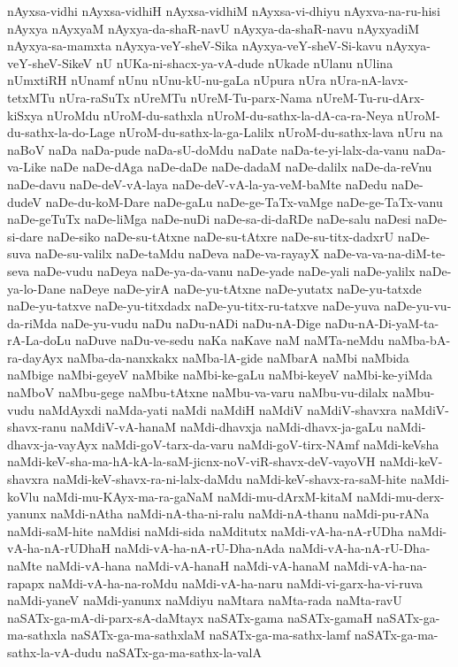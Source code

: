 {nAyxsa-vidhi
nAyxsa-vidhiH
nAyxsa-vidhiM
nAyxsa-vi-dhiyu
nAyxva-na-ru-hisi
nAyxya
nAyxyaM
nAyxya-da-shaR-navU
nAyxya-da-shaR-navu
nAyxyadiM
nAyxya-sa-mamxta
nAyxya-veY-sheV-Sika
nAyxya-veY-sheV-Si-kavu
nAyxya-veY-sheV-SikeV
nU
nUKa-ni-shacx-ya-vA-dude
nUkade
nUlanu
nUlina
nUmxtiRH
nUnamf
nUnu
nUnu-kU-nu-gaLa
nUpura
nUra
nUra-nA-lavx-tetxMTu
nUra-raSuTx
nUreMTu
nUreM-Tu-parx-Nama
nUreM-Tu-ru-dArx-kiSxya
nUroMdu
nUroM-du-sathxla
nUroM-du-sathx-la-dA-ca-ra-Neya
nUroM-du-sathx-la-do-Lage
nUroM-du-sathx-la-ga-Lalilx
nUroM-du-sathx-lava
nUru
na
naBoV
naDa
naDa-pude
naDa-sU-doMdu
naDate
naDa-te-yi-lalx-da-vanu
naDa-va-Like
naDe
naDe-dAga
naDe-daDe
naDe-dadaM
naDe-dalilx
naDe-da-reVnu
naDe-davu
naDe-deV-vA-laya
naDe-deV-vA-la-ya-veM-baMte
naDedu
naDe-dudeV
naDe-du-koM-Dare
naDe-gaLu
naDe-ge-TaTx-vaMge
naDe-ge-TaTx-vanu
naDe-geTuTx
naDe-liMga
naDe-nuDi
naDe-sa-di-daRDe
naDe-salu
naDesi
naDe-si-dare
naDe-siko
naDe-su-tAtxne
naDe-su-tAtxre
naDe-su-titx-dadxrU
naDe-suva
naDe-su-valilx
naDe-taMdu
naDeva
naDe-va-rayayX
naDe-va-va-na-diM-te-seva
naDe-vudu
naDeya
naDe-ya-da-vanu
naDe-yade
naDe-yali
naDe-yalilx
naDe-ya-lo-Dane
naDeye
naDe-yirA
naDe-yu-tAtxne
naDe-yutatx
naDe-yu-tatxde
naDe-yu-tatxve
naDe-yu-titxdadx
naDe-yu-titx-ru-tatxve
naDe-yuva
naDe-yu-vu-da-riMda
naDe-yu-vudu
naDu
naDu-nADi
naDu-nA-Dige
naDu-nA-Di-yaM-ta-rA-La-doLu
naDuve
naDu-ve-sedu
naKa
naKave
naM
naMTa-neMdu
naMba-bA-ra-dayAyx
naMba-da-nanxkakx
naMba-lA-gide
naMbarA
naMbi
naMbida
naMbige
naMbi-geyeV
naMbike
naMbi-ke-gaLu
naMbi-keyeV
naMbi-ke-yiMda
naMboV
naMbu-gege
naMbu-tAtxne
naMbu-va-varu
naMbu-vu-dilalx
naMbu-vudu
naMdAyxdi
naMda-yati
naMdi
naMdiH
naMdiV
naMdiV-shavxra
naMdiV-shavx-ranu
naMdiV-vA-hanaM
naMdi-dhavxja
naMdi-dhavx-ja-gaLu
naMdi-dhavx-ja-vayAyx
naMdi-goV-tarx-da-varu
naMdi-goV-tirx-NAmf
naMdi-keVsha
naMdi-keV-sha-ma-hA-kA-la-saM-jicnx-noV-viR-shavx-deV-vayoVH
naMdi-keV-shavxra
naMdi-keV-shavx-ra-ni-lalx-daMdu
naMdi-keV-shavx-ra-saM-hite
naMdi-koVlu
naMdi-mu-KAyx-ma-ra-gaNaM
naMdi-mu-dArxM-kitaM
naMdi-mu-derx-yanunx
naMdi-nAtha
naMdi-nA-tha-ni-ralu
naMdi-nA-thanu
naMdi-pu-rANa
naMdi-saM-hite
naMdisi
naMdi-sida
naMditutx
naMdi-vA-ha-nA-rUDha
naMdi-vA-ha-nA-rUDhaH
naMdi-vA-ha-nA-rU-Dha-nAda
naMdi-vA-ha-nA-rU-Dha-naMte
naMdi-vA-hana
naMdi-vA-hanaH
naMdi-vA-hanaM
naMdi-vA-ha-na-rapapx
naMdi-vA-ha-na-roMdu
naMdi-vA-ha-naru
naMdi-vi-garx-ha-vi-ruva
naMdi-yaneV
naMdi-yanunx
naMdiyu
naMtara
naMta-rada
naMta-ravU
naSATx-ga-mA-di-parx-sA-daMtayx
naSATx-gama
naSATx-gamaH
naSATx-ga-ma-sathxla
naSATx-ga-ma-sathxlaM
naSATx-ga-ma-sathx-lamf
naSATx-ga-ma-sathx-la-vA-dudu
naSATx-ga-ma-sathx-la-valA
}
